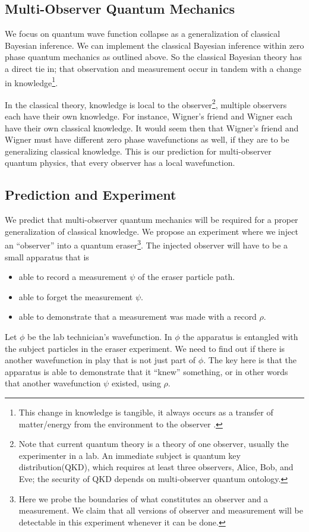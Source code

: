 \documentclass[12pt,a4paper]{article}
\theoremstyle{myrule}
\begin{document}
\subsection{Multi-Observer Quantum Mechanics}
We focus on quantum wave function collapse as a generalization of classical Bayesian inference.  We can implement the classical Bayesian inference within zero phase quantum mechanics as outlined above.  So the classical Bayesian theory has a direct tie in; that observation and measurement occur in tandem with a change in knowledge\footnote{This change in knowledge is tangible, it always occurs as a transfer of matter/energy from the environment to the observer \cite{thrust}.}.  

In the classical theory, knowledge is local to the observer\footnote{Note that current quantum theory is a theory of one observer, usually the experimenter in a lab.  An immediate subject is quantum key distribution(QKD), which requires at least three observers, Alice, Bob, and Eve; the security of QKD depends on multi-observer quantum ontology.}, multiple observers each have their own knowledge.  For instance, Wigner's friend and Wigner each have their own classical knowledge.  It would seem then that Wigner's friend and Wigner must have different zero phase wavefunctions as well, if they are to be generalizing classical knowledge.  This is our prediction for multi-observer quantum physics, that every observer has a local wavefunction. 

\subsection{Prediction and Experiment}

We predict that multi-observer quantum mechanics will be required for a proper generalization of classical knowledge.  We propose an experiment where we inject an ``observer'' into a quantum eraser\footnote{Here we probe the boundaries of what constitutes an observer and a measurement.  We claim that all versions of observer and measurement will be detectable in this experiment whenever it can be done.}.  The injected observer will have to be a small apparatus that is
\begin{itemize}
   \item able to record a measurement $\psi$ of the eraser particle path.
   \item able to forget the measurement $\psi$.
   \item able to demonstrate that a measurement was made with a record $\rho$.
\end{itemize}
Let $\phi$ be the lab technician's wavefunction.  In $\phi$ the apparatus is entangled with the subject particles in the eraser experiment.  We need to find out if there is another wavefunction in play that is not just part of $\phi$.  The key here is that the apparatus is able to demonstrate that it ``knew'' something, or in other words that another wavefunction $\psi$ existed, using $\rho$.
\end{document}

